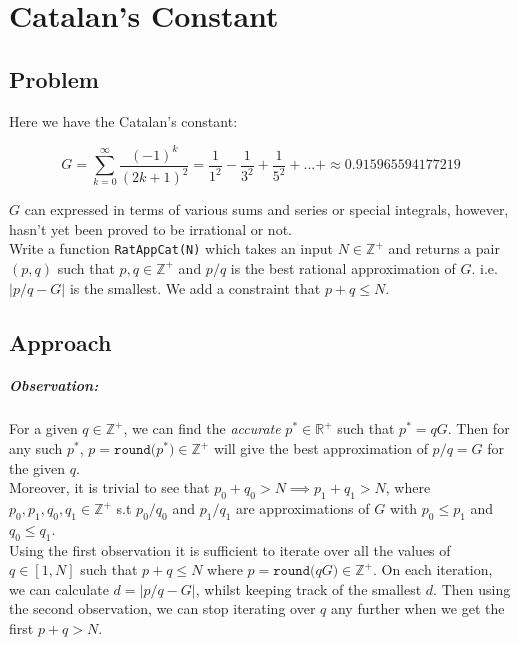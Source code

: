 \documentclass[11pt]{report}
\begin{document}
\chapter{Catalan's Constant}
\section*{Problem}
Here we have the Catalan's constant:

\begin{equation*}
	G = \sum_{k=0}^{\infty} \frac{(-1)^k}{(2k +1)^2} = \frac{1}{1^2} - \frac{1}{3^2} + \frac{1}{5^2} + ... + \approx 0.915965594177219
\end{equation*}

$G$ can expressed in terms of various sums and series or special integrals, however, hasn't yet been proved to be irrational or not. \\

Write a function \texttt{RatAppCat(N)} which takes an input $N\in\mathbb{Z^+}$ and returns a pair $(p, q)$ such that $p,q\in\mathbb{Z^+}$ and $p/q$ is the best rational approximation of $G$. i.e. $|p/q-G|$ is the smallest. We add a constraint that $p+q\leqslant N$.


\section{Approach}

\paragraph{Observation:}
For a given $q\in\mathbb{Z^+}$, we can find the \textit{accurate} $p^*\in\mathbb{R^+}$ such that $p^*=qG$. Then for any such $p^*$, $p=\texttt{round(}p^*\texttt{)} \in \mathbb{Z^+}$ will give the best approximation of $p/q =G$ for the given $q$. \\

Moreover, it is trivial to see that  $p_0 + q_0 > N \implies p_1 + q_1 > N$, where $p_0, p_1, q_0, q_1 \in \mathbb{Z^+}$ s.t $p_0/q_0$ and $p_1/q_1$ are approximations of $G$ with $p_0 \leq p_1$ and $q_0 \leq q_1$. \\

Using the first observation it is sufficient to iterate over all the values of $q\in[1,N]$ such that $p+q\leq N$ where $p = \texttt{round(}qG\texttt{)} \in \mathbb{Z^+}$. On each iteration, we can calculate $d = |p/q - G|$, whilst keeping track of the smallest $d$. Then using the second observation, we can stop iterating over $q$ any further when we get the first $p+q>N$. \\
\end{document}

